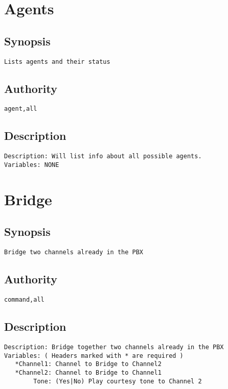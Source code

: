 \section{Agents}
\subsection{Synopsis}
\begin{verbatim}
Lists agents and their status
\end{verbatim}
\subsection{Authority}
\begin{verbatim}
agent,all
\end{verbatim}
\subsection{Description}
\begin{verbatim}
Description: Will list info about all possible agents.
Variables: NONE

\end{verbatim}


\section{Bridge}
\subsection{Synopsis}
\begin{verbatim}
Bridge two channels already in the PBX
\end{verbatim}
\subsection{Authority}
\begin{verbatim}
command,all
\end{verbatim}
\subsection{Description}
\begin{verbatim}
Description: Bridge together two channels already in the PBX
Variables: ( Headers marked with * are required )
   *Channel1: Channel to Bridge to Channel2
   *Channel2: Channel to Bridge to Channel1
        Tone: (Yes|No) Play courtesy tone to Channel 2


\end{verbatim}


